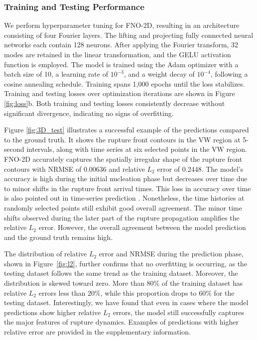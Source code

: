 \documentclass[draft]{agujournal2019}
\begin{document}
\subsubsection{Training and Testing Performance}
\label{sec:FNO-2D_training}

We perform hyperparameter tuning for FNO-2D, resulting in an architecture consisting of four Fourier layers. The lifting and projecting fully connected neural networks each contain 128 neurons. After applying the Fourier transform, 32 modes are retained in the linear transformation, and the GELU activation function is employed. The model is trained using the Adam optimizer with a batch size of 10, a learning rate of \(10^{-3}\), and a weight decay of \(10^{-4}\), following a cosine annealing schedule. Training spans 1,000 epochs until the loss stabilizes. Training and testing losses over optimization iterations are shown in Figure \ref{fig:loss}b. Both training and testing losses consistently decrease without significant divergence, indicating no signs of overfitting. 

Figure \ref{fig:3D_test} illustrates a successful example of the predictions compared to the ground truth. It shows the rupture front contours in the VW region at 5-second intervals, along with time series at six selected points in the VW region. FNO-2D accurately captures the spatially irregular shape of the rupture front contours with NRMSE of 0.00636 and relative \(L_2\) error of 0.2448. The model's accuracy is high during the initial nucleation phase but decreases over time due to minor shifts in the rupture front arrival times. This loss in accuracy over time is also pointed out in time-series prediction \cite{zhang2023learning}. Nonetheless, the time histories at randomly selected points still exhibit good overall agreement. The minor time shifts observed during the later part of the rupture propagation amplifies the relative \(L_2\) error. However, the overall agreement between the model prediction and the ground truth remains high. 

The distribution of relative \(L_2\) error and NRMSE during the prediction phase, shown in Figure~\ref{fig:l2}, further confirms that no overfitting is occurring, as the testing dataset follows the same trend as the training dataset. Moreover, the distribution is skewed toward zero. More than \(80\%\) of the training dataset has relative \(L_2\) errors less than \(20\%\), while this proportion drops to \(60\%\) for the testing dataset. Interestingly, we have found that even in cases where the model predictions show higher relative \(L_2\) errors, the model still successfully captures the major features of rupture dynamics. Examples of predictions with higher relative error are provided in the supplementary information.
\end{document}
